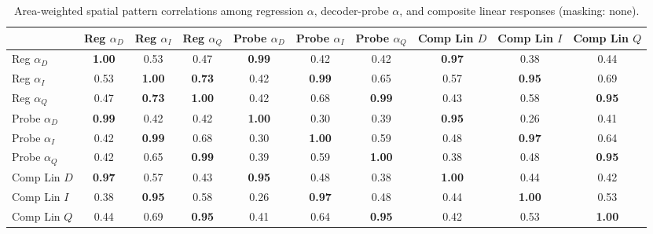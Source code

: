 \begin{table}[t]
\centering
\scriptsize
\begin{tabular}{lccccccccc}
\toprule
 & Reg $\alpha_{D}$ & Reg $\alpha_{I}$ & Reg $\alpha_{Q}$ & Probe $\alpha_{D}$ & Probe $\alpha_{I}$ & Probe $\alpha_{Q}$ & Comp Lin $D$ & Comp Lin $I$ & Comp Lin $Q$ \\
\midrule
Reg $\alpha_{D}$ & \textbf{1.00} & 0.53 & 0.47 & \textbf{0.99} & 0.42 & 0.42 & \textbf{0.97} & 0.38 & 0.44 \\
Reg $\alpha_{I}$ & 0.53 & \textbf{1.00} & \textbf{0.73} & 0.42 & \textbf{0.99} & 0.65 & 0.57 & \textbf{0.95} & 0.69 \\
Reg $\alpha_{Q}$ & 0.47 & \textbf{0.73} & \textbf{1.00} & 0.42 & 0.68 & \textbf{0.99} & 0.43 & 0.58 & \textbf{0.95} \\
Probe $\alpha_{D}$ & \textbf{0.99} & 0.42 & 0.42 & \textbf{1.00} & 0.30 & 0.39 & \textbf{0.95} & 0.26 & 0.41 \\
Probe $\alpha_{I}$ & 0.42 & \textbf{0.99} & 0.68 & 0.30 & \textbf{1.00} & 0.59 & 0.48 & \textbf{0.97} & 0.64 \\
Probe $\alpha_{Q}$ & 0.42 & 0.65 & \textbf{0.99} & 0.39 & 0.59 & \textbf{1.00} & 0.38 & 0.48 & \textbf{0.95} \\
Comp Lin $D$ & \textbf{0.97} & 0.57 & 0.43 & \textbf{0.95} & 0.48 & 0.38 & \textbf{1.00} & 0.44 & 0.42 \\
Comp Lin $I$ & 0.38 & \textbf{0.95} & 0.58 & 0.26 & \textbf{0.97} & 0.48 & 0.44 & \textbf{1.00} & 0.53 \\
Comp Lin $Q$ & 0.44 & 0.69 & \textbf{0.95} & 0.41 & 0.64 & \textbf{0.95} & 0.42 & 0.53 & \textbf{1.00} \\
\bottomrule
\end{tabular}
\caption{Area-weighted spatial pattern correlations among regression $\alpha$, decoder-probe $\alpha$, and composite linear responses (masking: none).}
\label{tab:corr_alpha_none}
\end{table}
